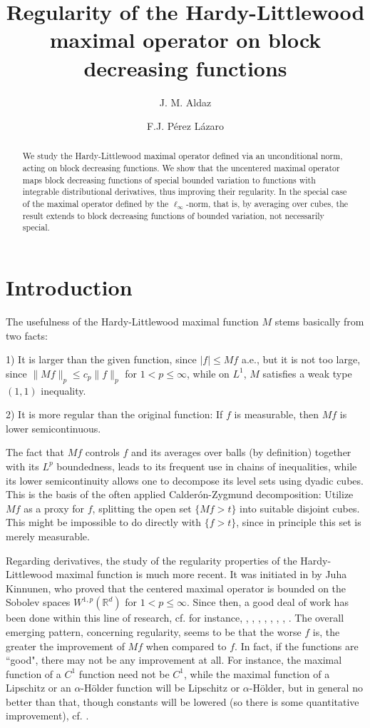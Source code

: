 \documentclass[12pt]{amsart}
\title[Regularity of the Hardy-Littlewood maximal operator]{Regularity of the Hardy-Littlewood maximal operator on
 block decreasing functions}
\author{J. M. Aldaz}
\author{F.J. P\'erez L\'azaro}
\numberwithin{equation}{section}
\theoremstyle{plain}
\theoremstyle{definition}
\theoremstyle{remark}
\begin{document}
\baselineskip=17pt

\maketitle
\begin{abstract}
We study the Hardy-Littlewood maximal operator defined via an
unconditional norm, acting on block decreasing functions. We show that
the uncentered maximal operator maps block decreasing functions of special bounded variation to functions with
integrable distributional derivatives,
thus improving  their regularity. In the special case of the
maximal operator
defined by the $\ell_\infty$-norm, that is, by averaging over cubes,
the result extends to block decreasing functions of bounded variation, not necessarily
special.
\end{abstract}

\section{Introduction}

The usefulness of the Hardy-Littlewood
maximal function $M$ stems basically from two facts:

1) It is
larger than
the given function, since $|f|\le Mf$ a.e.,
but it is not too large, since $\|Mf\|_p \le c_p \|f\|_p$ for  $1 < p \le \infty$, while on $L^1$, $M$
satisfies a weak type $(1,1)$ inequality.

2) It is more regular than the original function:
If $f$ is measurable, then $Mf$ is lower semicontinuous.

The fact that $Mf$ controls $f$ and its averages over balls (by
definition) together with its $L^p$ boundedness, leads to its frequent
use in chains of inequalities, while its lower semicontinuity
allows one to decompose its level sets using dyadic cubes. This is
the basis of the often applied Calder\'on-Zygmund decomposition: Utilize
$Mf$ as a proxy for $f$, splitting the open set $\{Mf > t\}$ into suitable
disjoint cubes. This might be impossible to do directly with $\{f > t\}$,
since in principle this set is merely measurable.

Regarding derivatives,
the study of the regularity properties of the  Hardy-Littlewood
maximal function is
much more recent. It
was initiated in \cite{Ki} by Juha Kinnunen, who
proved that the centered maximal operator is bounded on the
Sobolev spaces $W^{1,p}(\mathbb{R}^{d})$ for $1<p\le\infty$.  Since then,
a good deal of work has been done within
this line of research, cf. for instance, \cite{KiLi}, \cite{HaOn},
 \cite{KiSa},  \cite{Lu}, \cite{Bu}, \cite{Ko1},
\cite{Ko2}, \cite{Ta}. The overall emerging pattern,
concerning regularity,  seems to
be that the worse $f$ is, the greater the improvement of $Mf$ when
compared to $f$. In fact,
if the functions are ``good", there may not be any improvement at all.
For instance, the maximal function of a $C^1$ function need not be $C^1$,
while the maximal function of a Lipschitz or an $\alpha$-H\"older function
will be Lipschitz or $\alpha$-H\"older, but in general no better
than that, though constants will be lowered (so there is some
quantitative improvement), cf. \cite{ACP}.
\end{document}
